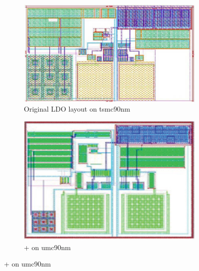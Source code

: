 
    \begin{figure}[ht]
      \centering
      \begin{subfigure}[t]{0.4\textwidth}
      \includegraphics[width=\textwidth,angle=90]{Fig/LDO_tsmc90_MR_1.eps}
      \caption{Original LDO layout on tsmc90nm}\label{fig:Original_LDO}
      \end{subfigure}
      \begin{subfigure}[t]{0.4\textwidth}
      \includegraphics[width=\textwidth,angle=90]{Fig/LDO_umc90_PlFuRtCDT_1.eps}
      \caption{\cite{msc-bhattacharya-tcad06}+\cite{Chin_DMR_ICCAD2013} on umc90nm}\label{subfig:LDO_umc90_PlFuRtCDT}

\end{subfigure}
\end{figure}
